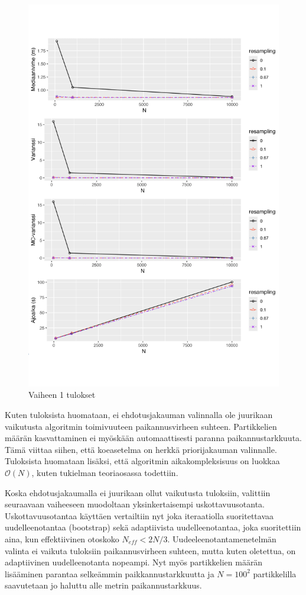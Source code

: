 \documentclass[
  12pt,
  a4paper, twoside]{book}
\begin{document}
\begin{figure}[H]
\centering
\includegraphics[width=15cm]{phase1_results_vertical_safe}
\caption{Vaiheen 1 tulokset}
\label{fig:phase1_results}
\end{figure}

Kuten tuloksista huomataan, ei ehdotusjakauman valinnalla ole juurikaan vaikutusta algoritmin toimivuuteen paikannusvirheen suhteen. Partikkelien määrän kasvattaminen ei myöskään automaattisesti paranna paikannustarkkuuta. Tämä viittaa siihen, että koeasetelma on herkkä priorijakauman valinnalle. Tuloksista huomataan lisäksi, että algoritmin aikakompleksisuus on luokkaa \(\mathcal{O}(N)\), kuten tukielman teoriaosassa todettiin.

Koska ehdotusjakaumalla ei juurikaan ollut vaikutusta tuloksiin, valittiin seuraavaan vaiheeseen muodoltaan yksinkertaisempi uskottavuusotanta. Uskottavuusotantaa käyttäen vertailtiin nyt joka iteraatiolla suoritettavaa uudelleenotantaa (bootstrap) sekä adaptiivista uudelleenotantaa, joka suoritettiin aina, kun effektiivinen otoskoko \(N_{eff}<2N/3\). Uudeeleenotantamenetelmän valinta ei vaikuta tuloksiin paikannusvirheen suhteen, mutta kuten oletettua, on adaptiivinen uudelleenotanta nopeampi. Nyt myös partikkelien määrän lisääminen parantaa selkeämmin paikkannustarkkuutta ja \(N=100^2\) partikkelilla saavutetaan jo haluttu alle metrin paikannustarkkuus.
\end{document}
